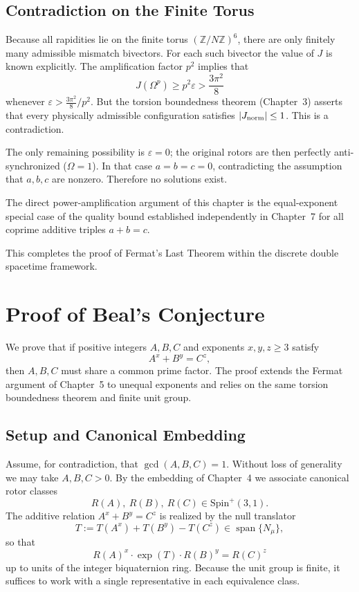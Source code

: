 \documentclass[dvipdfmx,a4paper]{article}
\theoremstyle{definition}
\theoremstyle{remark}
\newcommand{\Jnorm}{J_{\rm norm}}
\newcommand{\Jbound}{\frac{3\pi^2}{8}}
\begin{document}
\subsection{Contradiction on the Finite Torus}

Because all rapidities lie on the finite torus \( (\mathbb{Z}/N\mathbb{Z})^6 \), there are only finitely many admissible mismatch bivectors. For each such bivector the value of \( J \) is known explicitly. The amplification factor \( p^2 \) implies that
\[
J(\Omega^p) \geq p^2 \varepsilon > \Jbound
\]
whenever \( \varepsilon > \Jbound / p^2 \). But the torsion boundedness theorem (Chapter~3) asserts that every physically admissible configuration satisfies \( |\Jnorm| \leq 1 \). This is a contradiction.

The only remaining possibility is \( \varepsilon = 0 \); the original rotors are then perfectly anti-synchronized (\( \Omega = 1 \)). In that case \( a = b = c = 0 \), contradicting the assumption that \( a, b, c \) are nonzero. Therefore no solutions exist.

The direct power-amplification argument of this chapter is the equal-exponent special case of the quality bound established independently in Chapter~7 for all coprime additive triples \( a + b = c \).

This completes the proof of Fermat’s Last Theorem within the discrete double spacetime framework.

\section{Proof of Beal's Conjecture}

We prove that if positive integers \( A, B, C \) and exponents \( x, y, z \geq 3 \) satisfy
\[
A^x + B^y = C^z,
\]
then \( A, B, C \) must share a common prime factor. The proof extends the Fermat argument of Chapter~5 to unequal exponents and relies on the same torsion boundedness theorem and finite unit group.

\subsection{Setup and Canonical Embedding}

Assume, for contradiction, that \( \gcd(A,B,C) = 1 \). Without loss of generality we may take \( A, B, C > 0 \). By the embedding of Chapter~4 we associate canonical rotor classes
\[
R(A),\ R(B),\ R(C) \in \mathrm{Spin}^+(3,1).
\]
The additive relation \( A^x + B^y = C^z \) is realized by the null translator
\[
T := T(A^x) + T(B^y) - T(C^z) \in \operatorname{span}\{N_\mu\},
\]
so that
\[
R(A)^x \cdot \exp(T) \cdot R(B)^y = R(C)^z
\]
up to units of the integer biquaternion ring. Because the unit group is finite, it suffices to work with a single representative in each equivalence class.
\end{document}
